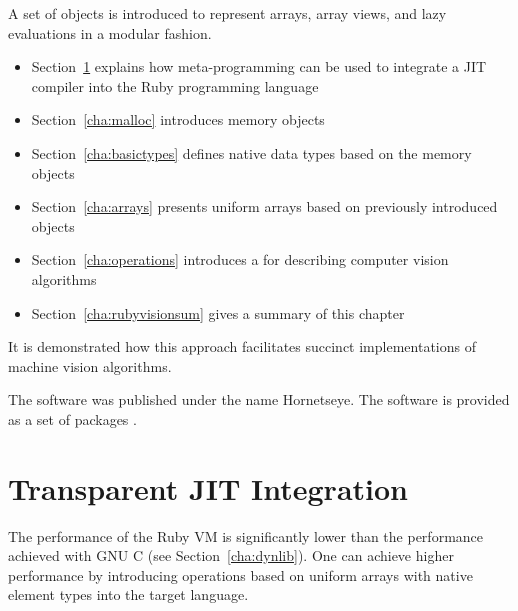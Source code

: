 \documentclass[12pt,a4paper,oneside,openright]{book}
\newcommand{\sct}[1]{Section~\ref{cha:#1}}
\newcommand{\removed}[1]{\cbstart\removedfragile{#1}\cbend{}}
\newcommand{\removedfragile}[1]{{\color{red}{\sout{#1}}}{}}
\newcommand{\added}[1]{\cbstart\addedfragile{#1}\cbend{}}
\newcommand{\addedfragile}[1]{{\color{green!50!black}{\uline{#1}}}{}}
\newcommand{\removed}[1]{}
\newcommand{\removedfragile}[1]{}
\newcommand{\added}[1]{#1}
\newcommand{\addedfragile}[1]{#1}
\newcommand{\changed}[2]{\removed{#1}\added{#2}}
\begin{document}
\begin{CJK}{UTF8}{}
A set of objects is introduced to represent arrays, array views, and lazy evaluations in a modular fashion.
\begin{itemize}
\item \sct{transjit} explains how meta-programming can be used to integrate a \ac{JIT} compiler into the Ruby programming language
\item \sct{malloc} introduces memory objects
\item \sct{basictypes} defines native data types based on the memory objects
\item \sct{arrays} presents uniform arrays based on previously introduced objects
\item \sct{operations} introduces a \changed{DSL}{library} for describing computer vision algorithms
\item \sct{rubyvisionsum} gives a summary of this chapter
\end{itemize}
It is demonstrated how this approach facilitates succinct implementations of machine vision algorithms.

The software was published under the name Hornetseye. The software is provided as a set of packages \added{(see page \pageref{cha:software})}.

\section{Transparent \acs{JIT} Integration}\label{cha:transjit}
The performance of the Ruby \ac{VM} is significantly lower than the performance achieved with \acs{GNU} C (see \sct{dynlib}). One can achieve higher performance by introducing operations based on uniform arrays with native element types into the target language.


\end{CJK}
\end{document}

